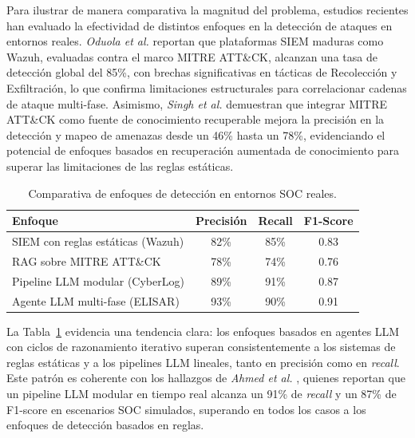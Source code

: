 Para ilustrar de manera comparativa la magnitud del problema, estudios recientes han evaluado la efectividad de distintos enfoques en la detección de ataques en entornos reales. \textit{Oduola et al.} \cite{oduola2025wazuh} reportan que plataformas SIEM maduras como Wazuh, evaluadas contra el marco MITRE ATT\&CK, alcanzan una tasa de detección global del 85\%, con brechas significativas en tácticas de Recolección y Exfiltración, lo que confirma limitaciones estructurales para correlacionar cadenas de ataque multi-fase. Asimismo, \textit{Singh et al.} \cite{singh2026cloudtrail} demuestran que integrar MITRE ATT\&CK como fuente de conocimiento recuperable mejora la precisión en la detección y mapeo de amenazas desde un 46\% hasta un 78\%, evidenciando el potencial de enfoques basados en recuperación aumentada de conocimiento para superar las limitaciones de las reglas estáticas.

\begin{table}[H]
\centering
\renewcommand{\arraystretch}{1.2}
\caption{Comparativa de enfoques de detección en entornos SOC reales.}
\renewcommand{\tablename}{Table}
\setlength{\arrayrulewidth}{1pt}
\begin{tabularx}{0.9\textwidth}{@{} X c c c @{}}
\toprule
\hline
\textbf{Enfoque} & \textbf{Precisión} & \textbf{Recall} & \textbf{F1-Score} \\
\hline
\midrule
SIEM con reglas estáticas (Wazuh) \cite{oduola2025wazuh}  & 82\% & 85\% & 0.83 \\
RAG sobre MITRE ATT\&CK \cite{singh2026cloudtrail}         & 78\% & 74\% & 0.76 \\
Pipeline LLM modular (CyberLog) \cite{palma2025llm}   & 89\% & 91\% & 0.87 \\
Agente LLM multi-fase (ELISAR) \cite{hassan2026elisar}     & 93\% & 90\% & 0.91 \\
\bottomrule
\hline
\end{tabularx}
\label{tab:comparativa_enfoques}
\end{table}

La Tabla~\ref{tab:comparativa_enfoques} evidencia una tendencia clara: los enfoques basados en agentes LLM con ciclos de razonamiento iterativo superan consistentemente a los sistemas de reglas estáticas y a los pipelines LLM lineales, tanto en precisión como en \textit{recall}. Este patrón es coherente con los hallazgos de \textit{Ahmed et al.} \cite{palma2025llm}, quienes reportan que un pipeline LLM modular en tiempo real alcanza un 91\% de \textit{recall} y un 87\% de F1-score en escenarios SOC simulados, superando en todos los casos a los enfoques de detección basados en reglas.


